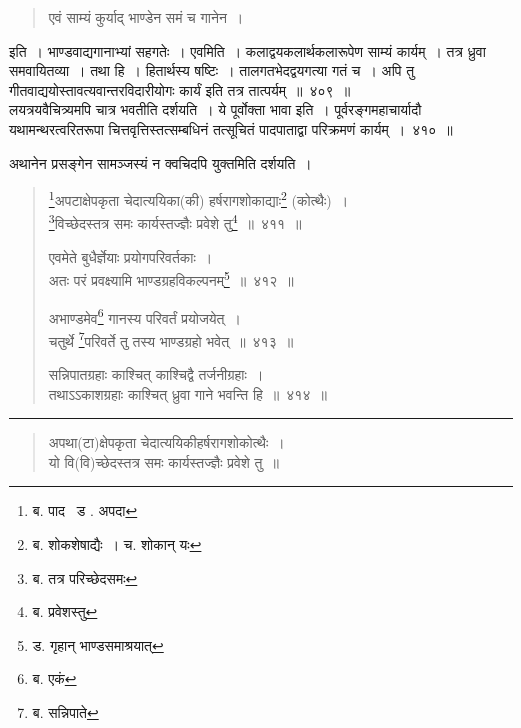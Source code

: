 \documentclass[11pt, openany]{book}
\begin{document}
\begin{quote}
{\qt एवं साम्यं कुर्याद् भाण्डेन समं च गानेन~। }
\end{quote}

\noindent
इति~। भाण्डवाद्यगानाभ्यां सहगतेः~। एवमिति~। कलाद्वयकलार्थकलारूपेण {\qtt साम्यं कार्यम्}~। तत्र ध्रुवा समवायितव्या~। तथा हि~। हितार्थस्य षष्टिः~। तालगतभेदद्वयगत्या गतं च~। अपि तु गीतवाद्ययोस्तावत्यवान्तरविदारीयोगः कार्यं इति तत्र तात्पर्यम्~॥~४०९~॥\\

लयत्रयवैचित्र्यमपि चात्र भवतीति दर्शयति~। ये पूर्वोक्ता भावा इति~। पूर्वरङ्गमहाचार्यादौ यथामन्थरत्वरितरूपा चित्तवृत्तिस्तत्सम्बधिनं तत्सूचितं पादपाताद्वा परिक्रमणं कार्यम्~।~४१०~॥\\

\begin{center}
अथानेन प्रसङ्गेन सामञ्जस्यं न क्वचिदपि युक्तमिति दर्शयति~।
\end{center}

\newpage

\begin{quote}
{\na \renewcommand{\thefootnote}{1}\footnote{ब. पाद \textendash\ ड . अपदा}अपटाक्षेपकृता चेदात्ययिका(की) हर्षरागशोकाद्याः\renewcommand{\thefootnote}{2}\footnote{ब. शोकशेषाद्यैः~। च. शोकान् यः} (कोत्थैः)~।\\
 \renewcommand{\thefootnote}{3}\footnote{ब. तत्र परिच्छेदसमः}विच्छेदस्तत्र समः कार्यस्तज्ज्ञैः प्रवेशे तु\renewcommand{\thefootnote}{4}\footnote{ब. प्रवेशस्तु}~॥~४११~॥

 एवमेते बुधैर्ज्ञेयाः प्रयोगपरिवर्तकाः~।\\
 अतः परं प्रवक्ष्यामि भाण्डग्रहविकल्पनम्\renewcommand{\thefootnote}{5}\footnote{ड. गृहान् भाण्डसमाश्रयात्}~॥~४१२~॥

 अभाण्डमेव\renewcommand{\thefootnote}{6}\footnote{ब. एकं} गानस्य परिवर्तं प्रयोजयेत्~।\\
 चतुर्थे \renewcommand{\thefootnote}{7}\footnote{ब. सन्निपाते}परिवर्ते तु तस्य भाण्डग्रहो भवेत्~॥~४१३~॥

 सन्निपातग्रहाः काश्चित् काश्चिद्वै तर्जनीग्रहाः~।\\
 तथाऽऽकाशग्रहाः काश्चित् ध्रुवा गाने भवन्ति हि~॥~४१४~॥}
\end{quote}

\hrule

\begin{quote}
{\qt अपथा(टा)क्षेपकृता चेदात्ययिकीहर्षरागशोकोत्थैः~। \\
 यो वि(वि)च्छेदस्तत्र समः कार्यस्तज्ज्ञैः प्रवेशे तु~॥}
\end{quote}
\end{document}
